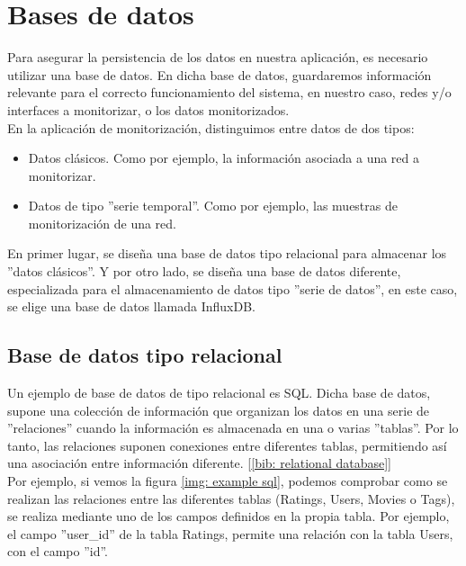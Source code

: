 \documentclass[a4paper, oneside, 12pt]{book}
\begin{document}
	
	\pagebreak
	
	\section{Bases de datos}
	
	\noindent Para asegurar la persistencia de los datos en nuestra aplicación, es necesario utilizar una base de datos. En dicha base de datos, guardaremos información relevante para el correcto funcionamiento del sistema, en nuestro caso, redes y/o interfaces a monitorizar, o los datos monitorizados. \\
	
	\noindent En la aplicación de monitorización, distinguimos entre datos de dos tipos:
	
	\begin{itemize}
		\item Datos clásicos. Como por ejemplo, la información asociada a una red a monitorizar.
		\item Datos de tipo ''serie temporal''. Como por ejemplo, las muestras de monitorización de una red.
	\end{itemize}

	\noindent En primer lugar, se diseña una base de datos tipo relacional para almacenar los ''datos clásicos''. Y por otro lado, se diseña una base de datos diferente, especializada para el almacenamiento de datos tipo ''serie de datos'', en este caso, se elige una base de datos llamada InfluxDB.
	
	\subsection{Base de datos tipo relacional}
	
	\noindent Un ejemplo de base de datos de tipo relacional es SQL. Dicha base de datos, supone una colección de información que organizan los datos en una serie de ''relaciones'' cuando la información es almacenada en una o varias ''tablas''. Por lo tanto, las relaciones suponen conexiones entre diferentes tablas, permitiendo así una asociación entre información diferente. [\ref{bib: relational database}] \\
	
	\noindent Por ejemplo, si vemos la figura \ref{img: example sql}, podemos comprobar como se realizan las relaciones entre las diferentes tablas (Ratings, Users, Movies o Tags), se realiza mediante uno de los campos definidos en la propia tabla. Por ejemplo, el campo ''user\_id'' de la tabla Ratings, permite una relación con la tabla Users, con el campo ''id''.
	
\end{document}
